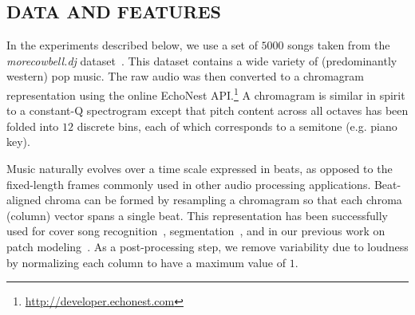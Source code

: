 \documentclass{article}
\begin{document}
\subsection{DATA AND FEATURES}
\label{ssec:feats}
In the experiments described below, we use a set of $5000$ songs taken
from the \emph{morecowbell.dj} dataset~\cite{Bertin-Mahieux2010a}.
This dataset contains a wide variety of (predominantly western) pop
music.  The raw audio was then converted to a chromagram
representation using the online EchoNest
API.\footnote{\url{http://developer.echonest.com}} A chromagram is
similar in spirit to a constant-Q spectrogram except that pitch
content across all octaves has been folded into $12$ discrete bins,
each of which corresponds to a semitone (e.g. piano key).
%

Music naturally evolves over a time scale expressed in beats, as
opposed to the fixed-length frames commonly used in other audio
processing applications.  Beat-aligned chroma can be formed by
resampling a chromagram so that each chroma (column) vector spans a
single beat.  This representation has been successfully used for cover
song recognition~\cite{Ellis2007a}, segmentation~\cite{Weiss2010}, and
in our previous work on patch modeling~\cite{Bertin-Mahieux2010a}.  As
a post-processing step, we remove variability due to loudness by
normalizing each column to have a maximum value of $1$.


\end{document}

